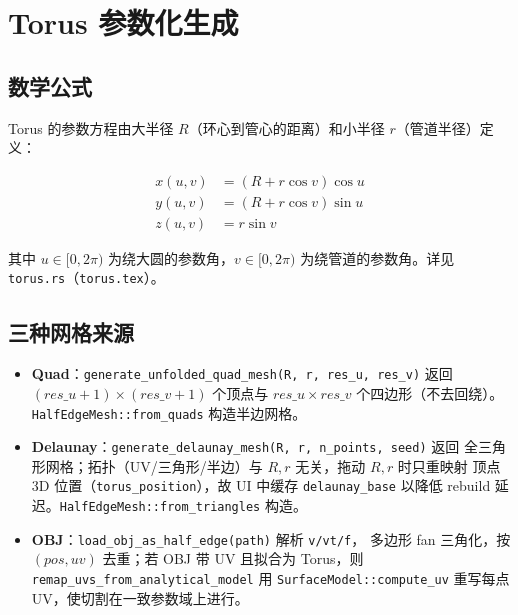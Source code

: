 \documentclass[12pt,a4paper]{article}
\begin{document}
\section{Torus 参数化生成}

\subsection{数学公式}

Torus 的参数方程由大半径 $R$（环心到管心的距离）和小半径 $r$（管道半径）定义：

\begin{equation}
\begin{aligned}
x(u,v) &= (R + r\cos v)\cos u \\
y(u,v) &= (R + r\cos v)\sin u \\
z(u,v) &= r\sin v
\end{aligned}
\end{equation}

其中 $u \in [0, 2\pi)$ 为绕大圆的参数角，$v \in [0, 2\pi)$ 为绕管道的参数角。详见 \texttt{torus.rs}（\texttt{torus.tex}）。

\subsection{三种网格来源}

\begin{itemize}
\item \textbf{Quad}：\texttt{generate\_unfolded\_quad\_mesh(R, r, res\_u, res\_v)} 返回
  $(res\_u+1)\times(res\_v+1)$ 个顶点与 $res\_u\times res\_v$ 个四边形（不去回绕）。
  \texttt{HalfEdgeMesh::from\_quads} 构造半边网格。
\item \textbf{Delaunay}：\texttt{generate\_delaunay\_mesh(R, r, n\_points, seed)} 返回
  全三角形网格；拓扑（UV/三角形/半边）与 $R,r$ 无关，拖动 $R,r$ 时只重映射
  顶点 3D 位置（\texttt{torus\_position}），故 UI 中缓存 \texttt{delaunay\_base}
  以降低 rebuild 延迟。\texttt{HalfEdgeMesh::from\_triangles} 构造。
\item \textbf{OBJ}：\texttt{load\_obj\_as\_half\_edge(path)} 解析 \texttt{v/vt/f}，
  多边形 fan 三角化，按 $(pos,uv)$ 去重；若 OBJ 带 UV 且拟合为 Torus，则
  \texttt{remap\_uvs\_from\_analytical\_model} 用 \texttt{SurfaceModel::compute\_uv}
  重写每点 UV，使切割在一致参数域上进行。
\end{itemize}
\end{document}
